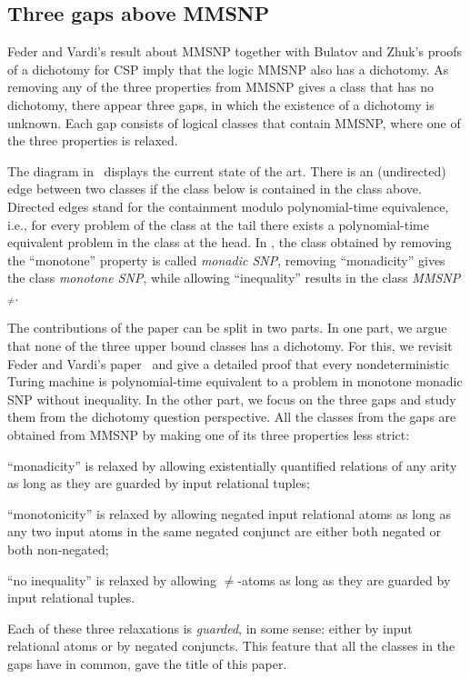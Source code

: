 \documentclass{lmcs}
\begin{document}

\subsection{Three gaps above MMSNP}
Feder and Vardi's result about MMSNP together with Bulatov and Zhuk's proofs of a dichotomy for CSP imply that the logic MMSNP also has a dichotomy.
%
As removing any of the three properties from MMSNP gives a class that has no dichotomy, there appear three gaps, in which the existence of a dichotomy is unknown.
%
Each gap consists of logical classes that contain MMSNP, where one of the three properties is relaxed.

The diagram in~ displays the current state of the art.
%
There is an (undirected) edge between two classes if the class below is contained in the class above.
%
Directed edges stand for the containment modulo polynomial-time equivalence, i.e., for every problem of the class at the tail there exists a polynomial-time equivalent problem in the class at the head.
%
In , the class obtained by removing the ``monotone'' property is called \emph{monadic SNP}, removing ``monadicity'' gives the class \emph{monotone SNP}, while allowing ``inequality'' results in the class \emph{MMSNP$_{\not=}$}.

The contributions of the paper can be split in two parts.
%
In one part, we argue that none of the three upper bound classes has a dichotomy.
%
For this, we revisit Feder and Vardi's paper~\cite{federvardi1998} and give a detailed proof that every nondeterministic Turing machine is polynomial-time equivalent to a problem in monotone monadic SNP without inequality.
%
In the other part, we focus on the three gaps and study them from the dichotomy question perspective.
%
All the classes from the gaps are obtained from MMSNP by making one of its three properties less strict:
%
\begin{compactitem}
  \item ``monadicity'' is relaxed by allowing existentially quantified relations of any arity as long as they are guarded by input relational tuples;
  \item ``monotonicity'' is relaxed by allowing negated input relational atoms as long as any two input atoms in the same negated conjunct are either both negated or both non-negated;
  \item ``no inequality'' is relaxed by allowing $\not=$-atoms as long as they are guarded by input relational tuples.
\end{compactitem}
Each of these three relaxations is \emph{guarded}, in some sense: either by input relational atoms or by negated conjuncts.
%
This feature that all the classes in the gaps have in common, gave the title of this paper.
\end{document}
